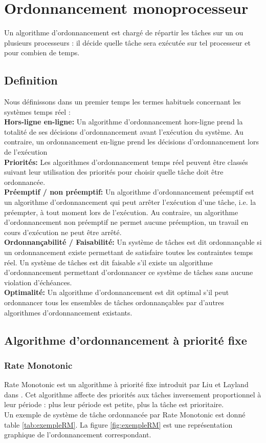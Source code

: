 \section{Ordonnancement monoprocesseur}
\vspace{-1cm}
Un algorithme d’ordonnancement est chargé de répartir les tâches sur un ou plusieurs processeurs : il décide quelle tâche sera exécutée sur tel processeur et pour combien de temps. 
\subsection*{Definition}
\vspace{-1cm}
Nous définissons dans un premier temps les termes habituels concernant les systèmes temps réel : \\
\indent \textbf{Hors-ligne en-ligne:} Un algorithme d’ordonnancement hors-ligne prend la totalité de ses décisions d’ordonnancement avant l’exécution du système. Au contraire, un ordonnancement en-ligne prend les décisions d’ordonnancement lors de l’exécution 
\\ \indent \textbf{Priorités:} Les algorithmes d’ordonnancement temps réel peuvent être classés suivant leur utilisation des priorités pour choisir quelle tâche doit être ordonnancée.
\\ \indent \textbf{Préemptif / non préemptif:} Un algorithme d’ordonnancement préemptif est un algorithme d’ordonnancement qui peut arrêter l’exécution d’une tâche, i.e. la préempter, à tout moment lors de l’exécution. Au contraire, un algorithme d’ordonnancement non préemptif ne permet aucune préemption, un travail en cours d’exécution ne peut être arrêté.
\\ \indent \textbf{Ordonnançabilité / Faisabilité:} Un système de tâches est dit ordonnançable si un ordonnancement existe permettant de satisfaire toutes les contraintes temps réel. Un système de tâches est dit faisable s’il existe un algorithme d’ordonnancement permettant d’ordonnancer ce système de tâches sans aucune violation d’échéances.
\\ \indent \textbf{Optimalité:} Un algorithme d’ordonnancement est dit optimal s’il peut ordonnancer tous les ensembles de tâches ordonnançables par d’autres algorithmes d’ordonnancement existants.

\subsection{Algorithme d’ordonnancement à priorité fixe}
\subsubsection{Rate Monotonic \cite{LL73}}
\vspace{-1cm}
Rate Monotonic est un algorithme à priorité fixe introduit par Liu et Layland dans \cite{LL73}. Cet algorithme affecte des priorités aux tâches inversement proportionnel à leur période : plus leur période est petite, plus la tâche est prioritaire. 
\\ \indent Un exemple de système de tâche ordonnancée par Rate Monotonic est donné table \ref{tab:exempleRM}. La figure \ref{fig:exempleRM} est une représentation graphique de l'ordonnancement correspondant.

